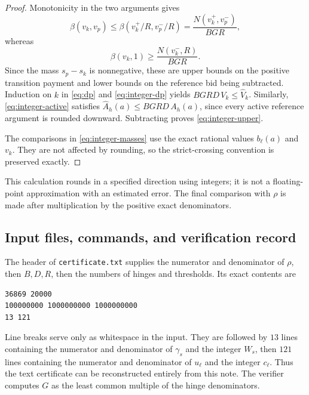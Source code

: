 \documentclass[11pt]{article}
\theoremstyle{definition}
\theoremstyle{remark}
\begin{document}
\begin{proof}
Monotonicity in the two arguments gives
\[
  \beta(v_k,v_p)
       \le\beta(v_k^+/R,v_p^-/R)
       =\frac{N(v_k^+,v_p^-)}{BGR},
\]
whereas
\[
  \beta(v_k,1)\ge\frac{N(v_k^-,R)}{BGR}.
\]
Since the mass $s_p-s_k$ is nonnegative, these are upper bounds on the
positive transition payment and lower bounds on the reference bid being
subtracted. Induction on $k$ in \eqref{eq:dp} and
\eqref{eq:integer-dp} yields $BGRD\,V_k\le\widehat V_k$.
Similarly, \eqref{eq:integer-active} satisfies
$\widehat A_h(a)\le BGRD\,A_h(a)$, since every active reference argument is
rounded downward. Subtracting proves \eqref{eq:integer-upper}.

The comparisons in \eqref{eq:integer-masses} use the exact rational
values $b_\ell(a)$ and $v_k$. They are not affected by rounding, so the
strict-crossing convention is preserved exactly.
\end{proof}

This calculation rounds in a specified direction using integers; it is
not a floating-point approximation with an estimated error. The final
comparison with $\rho$ is made after multiplication by the positive exact
denominators.

\subsection{Input files, commands, and verification record}

The header of \texttt{certificate.txt} supplies the numerator and denominator
of $\rho$, then $B,D,R$, then the numbers of hinges and thresholds.
Its exact contents are
\begin{verbatim}
36869 20000
100000000 1000000000 1000000000
13 121
\end{verbatim}
Line breaks serve only as whitespace in the input.
They are followed by $13$ lines containing the numerator and denominator
of $\gamma_s$ and the integer $W_s$, then $121$ lines containing the
numerator and denominator of $u_\ell$ and the integer $c_\ell$.
Thus the text certificate can be reconstructed entirely from this note.
The verifier computes $G$ as the least common multiple of the hinge
denominators.
\end{document}
